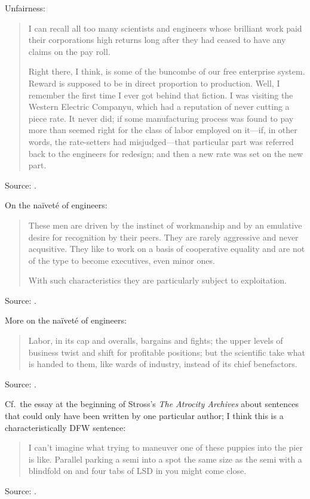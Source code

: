 \documentclass[a4paper]{article}
\begin{document}
Unfairness:
\begin{quotation}
	I can recall all too many scientists and engineers whose brilliant
	work paid their corporations high returns long after they had
	ceased to have any claims on the pay roll.

	Right there, I think, is some of the buncombe of our free
	enterprise system.  Reward is supposed to be in direct proportion
	to production.	Well, I remember the first time I ever got behind
	that fiction.  I was visiting the Western Electric Companyu,
	which had a reputation of never cutting a piece rate.  It never
	did; if some manufacturing process was found to pay more than
	seemed right for the class of labor employed on it---if, in
	other words, the rate-setters had misjudged---that particular
	part was referred back to the engineers for redesign; and then
	a new rate was set on the new part.
\end{quotation}
Source: \citet[p.~93]{Mills1946}.
\medskip

On the na\"ivet\'e of engineers:
\begin{quotation}
	These men are driven by the instinct of workmanship and by an
	emulative desire for recognition by their peers.  They are
	rarely aggressive and never acqusitive.  They like to work on
	a basis of cooperative equality and are not of the type to
	become executives, even minor ones.

	With such characteristics they are particularly subject to
	exploitation.
\end{quotation}
Source: \citet[p.~92]{Mills1946}.
\medskip

More on the na\"ivet\'e of engineers:
\begin{quote}
	Labor, in its cap and overalls, bargains and fights; the upper
	levels of business twist and shift for profitable positions;
	but the scientific take what is handed to them, like wards of
	industry, instead of its chief benefactors.
\end{quote}
Source: \citet[pp.~127--8]{Mills1946}.
\medskip

Cf.\ the essay at the beginning of Stross's \emph{The Atrocity
Archives} \citep{Stross2004} about sentences that could only have
been written by one particular author; I think this is a
characteristically DFW sentence:
\begin{quote}
	I can't imagine what trying to maneuver one of these puppies
	into the pier is like. Parallel parking a semi into a spot the
	same size as the semi with a blindfold on and four tabs of LSD
	in you might come close.
\end{quote}
Source: \citet[p.~50]{Wallace1996}.
\medskip
\end{document}
